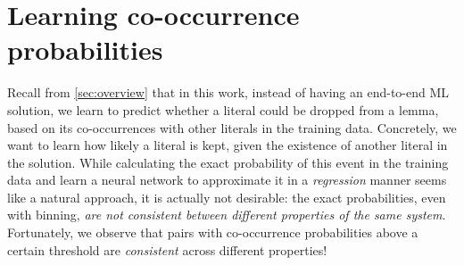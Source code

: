 \section{Learning co-occurrence probabilities}
\label{sec:learning-signal}
\newcommand{\thres}{\textit{threshold}}


Recall from \cref{sec:overview} that in this work, instead of having an end-to-end ML solution, we learn to predict whether a literal could be dropped from a lemma, based on its co-occurrences with other literals in the training data. Concretely, we want to learn how likely a literal is kept, given the existence of another literal in the solution. While calculating the exact probability of this event in the training data and learn a neural network to approximate it in a \emph{regression} manner seems like a natural approach, it is actually not desirable: the exact probabilities, even with binning, \emph{are not consistent between different properties of the same system}. Fortunately, we observe that pairs with co-occurrence probabilities above a certain threshold are \emph{consistent} across different properties!

